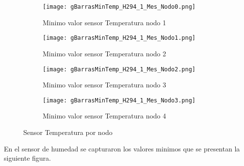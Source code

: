 \documentclass{article}
\begin{document}
        \begin{figure}[h!]
            \centering\begin{subfigure}[h]{0.42\linewidth}
                                    \texttt{[image: gBarrasMinTemp\_H294\_1\_Mes\_Nodo0.png]}
                                    \caption{Minimo valor sensor Temperatura nodo 1}
                                    \label{fig:TempMin1}
                                \end{subfigure}
                                \begin{subfigure}[h]{0.42\linewidth}
                                    \texttt{[image: gBarrasMinTemp\_H294\_1\_Mes\_Nodo1.png]}
                                    \caption{Minimo valor sensor Temperatura nodo 2}
                                    \label{fig:TempMin2}
                                \end{subfigure}
                                \begin{subfigure}[h]{0.42\linewidth}
                                    \texttt{[image: gBarrasMinTemp\_H294\_1\_Mes\_Nodo2.png]}
                                    \caption{Minimo valor sensor Temperatura nodo 3}
                                    \label{fig:TempMin3}
                                \end{subfigure}
                                \begin{subfigure}[h]{0.42\linewidth}
                                    \texttt{[image: gBarrasMinTemp\_H294\_1\_Mes\_Nodo3.png]}
                                    \caption{Minimo valor sensor Temperatura nodo 4}
                                    \label{fig:TempMin4}
                                \end{subfigure}
                                \caption{Sensor Temperatura por nodo}
            \label{fig:fig7}
        \end{figure}
        \newpage
        En el sensor de humedad se capturaron los valores minimos que se presentan la siguiente figura.
\end{document}
